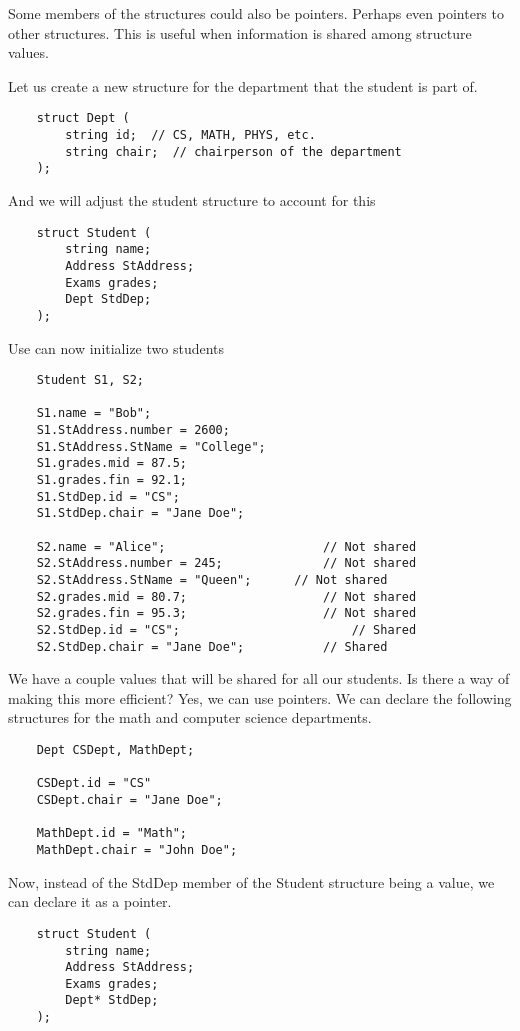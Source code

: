 \documentclass[]{article}
\begin{document}
Some members of the structures could also be pointers. Perhaps even pointers to other structures. This is useful when information is shared among structure values. 

Let us create a new structure for the department that the student is part of.

\begin{lstlisting}
	struct Dept (
		string id;  // CS, MATH, PHYS, etc.
		string chair;  // chairperson of the department
	);
\end{lstlisting}\bigbreak

And we will adjust the student structure to account for this

\begin{lstlisting}
	struct Student (
		string name;
		Address StAddress;
		Exams grades;
		Dept StdDep;
	);
\end{lstlisting}\bigbreak

Use can now initialize two students

\begin{lstlisting}
	Student S1, S2;
	
	S1.name = "Bob";
	S1.StAddress.number = 2600;
	S1.StAddress.StName = "College";
	S1.grades.mid = 87.5;
	S1.grades.fin = 92.1;
	S1.StdDep.id = "CS";
	S1.StdDep.chair = "Jane Doe";
	
	S2.name = "Alice";						// Not shared
	S2.StAddress.number = 245;				// Not shared
	S2.StAddress.StName = "Queen";		// Not shared
	S2.grades.mid = 80.7;					// Not shared
	S2.grades.fin = 95.3;					// Not shared
	S2.StdDep.id = "CS";						// Shared
	S2.StdDep.chair = "Jane Doe";			// Shared
\end{lstlisting}\bigbreak

We have a couple values that will be shared for all our students. Is there a way of making this more efficient? Yes, we can use pointers. We can declare the following structures for the math and computer science departments.

\begin{lstlisting}
	Dept CSDept, MathDept;
	
	CSDept.id = "CS"
	CSDept.chair = "Jane Doe";
	
	MathDept.id = "Math";
	MathDept.chair = "John Doe";
\end{lstlisting}\bigbreak

Now, instead of the StdDep member of the Student structure being a value, we can declare it as a pointer.

\begin{lstlisting}
	struct Student (
		string name;
		Address StAddress;
		Exams grades;
		Dept* StdDep;
	);
\end{lstlisting}\bigbreak
\end{document}
